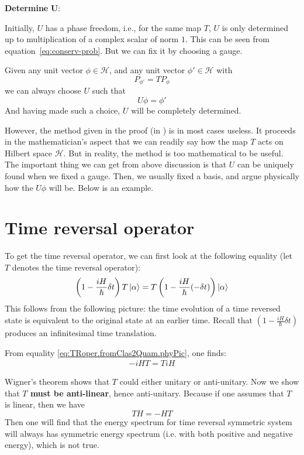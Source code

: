 \documentclass{article}
\begin{document}
\textbf{Determine} $\mathbf{U}$:

Initially, $U$ has a phase freedom, i.e., for the same map $T$, $U$ is only
determined up to multiplication of a complex scalar of norm $1$. This can be
seen from equation~\ref{eq:conserv-prob}. But we can fix it by choosing a gauge.

Given any unit vector $\phi\in\mathscr{H}$, and any unit vector
$\phi'\in\mathscr{H}$ with
\begin{equation}
    P_{\phi'}=TP_\phi
\end{equation}
we can always choose $U$ such that
\begin{equation}
    U\phi = \phi'
\end{equation}
And having made such a choice, $U$ will be completely determined. 

However, the method given in the proof (in \cite{sternberg1995group}) is in most cases
useless. It proceeds in the mathematician's aspect that we can readily say how the
map $T$ acts on Hilbert space $\mathscr{H}$. But in reality, the method is too
mathematical to be useful. The important thing we can get from above discussion
is that $U$ can be uniquely found when we fixed a gauge. Then, we usually fixed
a basis, and argue physically how the $U\phi$ will be. Below is an example.

\section{Time reversal operator}
\label{sec:Time-reversal-operator}

To get the time reversal operator, we can first look at the following
equality (let $T$ denotes the time reversal operator):
\begin{align}
    \left(1-\frac{iH}{\hbar}\delta t\right) T \ket{\alpha}
    = T\left(1-\frac{iH}{\hbar}(-\delta t)\right)\ket{\alpha}
    \label{eq:TRoper.fromClas2Quam.phyPic}
\end{align}
This follows from the following picture: the time evolution of a time reversed
state is equivalent to the original state at an earlier time. Recall that
$\left(1-\frac{iH}{\hbar}\delta t\right)$ produces an infinitesimal time
translation.

From equality \ref{eq:TRoper.fromClas2Quam.phyPic}, one finds:
\begin{align}
    -iHT = T i H
\end{align}

Wigner's theorem shows that $T$ could either unitary or anti-unitary.
Now we show that \textbf{$T$ must be anti-linear}, hence anti-unitary. Because if
one assumes that $T$ is linear, then we have
$$ TH = -HT $$
Then one will find that the energy spectrum for time
reversal symmetric system will always has symmetric energy spectrum (i.e. with
both positive and negative energy), which is not true.
\end{document}
